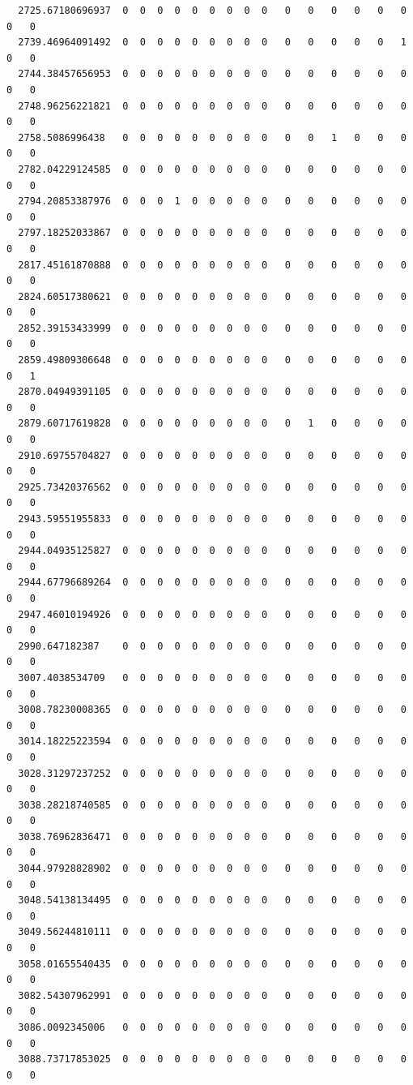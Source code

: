 \documentclass[
  letterpaper,
  DIV=11,
  numbers=noendperiod]{scrartcl}
\begin{document}
\begin{verbatim}
  2725.67180696937  0  0  0  0  0  0  0  0  0   0   0   0   0   0   0   0   0
  2739.46964091492  0  0  0  0  0  0  0  0  0   0   0   0   0   0   1   0   0
  2744.38457656953  0  0  0  0  0  0  0  0  0   0   0   0   0   0   0   0   0
  2748.96256221821  0  0  0  0  0  0  0  0  0   0   0   0   0   0   0   0   0
  2758.5086996438   0  0  0  0  0  0  0  0  0   0   0   1   0   0   0   0   0
  2782.04229124585  0  0  0  0  0  0  0  0  0   0   0   0   0   0   0   0   0
  2794.20853387976  0  0  0  1  0  0  0  0  0   0   0   0   0   0   0   0   0
  2797.18252033867  0  0  0  0  0  0  0  0  0   0   0   0   0   0   0   0   0
  2817.45161870888  0  0  0  0  0  0  0  0  0   0   0   0   0   0   0   0   0
  2824.60517380621  0  0  0  0  0  0  0  0  0   0   0   0   0   0   0   0   0
  2852.39153433999  0  0  0  0  0  0  0  0  0   0   0   0   0   0   0   0   0
  2859.49809306648  0  0  0  0  0  0  0  0  0   0   0   0   0   0   0   0   1
  2870.04949391105  0  0  0  0  0  0  0  0  0   0   0   0   0   0   0   0   0
  2879.60717619828  0  0  0  0  0  0  0  0  0   0   1   0   0   0   0   0   0
  2910.69755704827  0  0  0  0  0  0  0  0  0   0   0   0   0   0   0   0   0
  2925.73420376562  0  0  0  0  0  0  0  0  0   0   0   0   0   0   0   0   0
  2943.59551955833  0  0  0  0  0  0  0  0  0   0   0   0   0   0   0   0   0
  2944.04935125827  0  0  0  0  0  0  0  0  0   0   0   0   0   0   0   0   0
  2944.67796689264  0  0  0  0  0  0  0  0  0   0   0   0   0   0   0   0   0
  2947.46010194926  0  0  0  0  0  0  0  0  0   0   0   0   0   0   0   0   0
  2990.647182387    0  0  0  0  0  0  0  0  0   0   0   0   0   0   0   0   0
  3007.4038534709   0  0  0  0  0  0  0  0  0   0   0   0   0   0   0   0   0
  3008.78230008365  0  0  0  0  0  0  0  0  0   0   0   0   0   0   0   0   0
  3014.18225223594  0  0  0  0  0  0  0  0  0   0   0   0   0   0   0   0   0
  3028.31297237252  0  0  0  0  0  0  0  0  0   0   0   0   0   0   0   0   0
  3038.28218740585  0  0  0  0  0  0  0  0  0   0   0   0   0   0   0   0   0
  3038.76962836471  0  0  0  0  0  0  0  0  0   0   0   0   0   0   0   0   0
  3044.97928828902  0  0  0  0  0  0  0  0  0   0   0   0   0   0   0   0   0
  3048.54138134495  0  0  0  0  0  0  0  0  0   0   0   0   0   0   0   0   0
  3049.56244810111  0  0  0  0  0  0  0  0  0   0   0   0   0   0   0   0   0
  3058.01655540435  0  0  0  0  0  0  0  0  0   0   0   0   0   0   0   0   0
  3082.54307962991  0  0  0  0  0  0  0  0  0   0   0   0   0   0   0   0   0
  3086.0092345006   0  0  0  0  0  0  0  0  0   0   0   0   0   0   0   0   0
  3088.73717853025  0  0  0  0  0  0  0  0  0   0   0   0   0   0   0   0   0

\end{verbatim}
\end{document}
